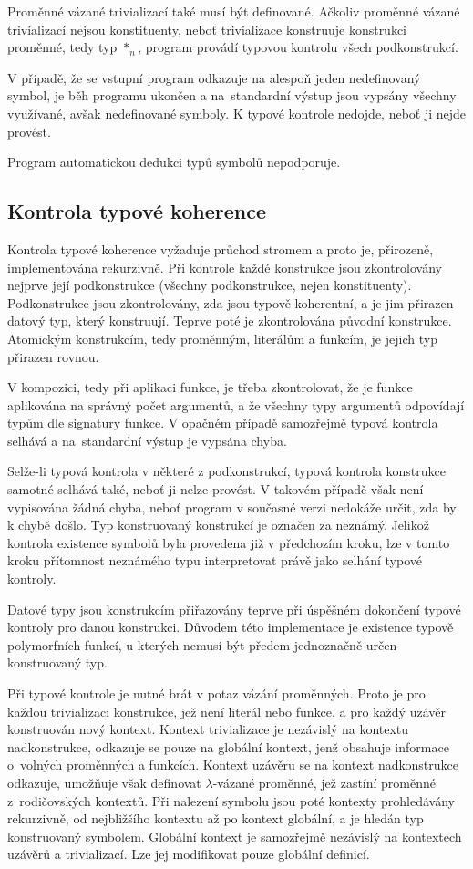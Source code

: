 \documentclass{article}
\begin{document}
Proměnné vázané trivializací také musí být definované. Ačkoliv proměnné vázané trivializací nejsou
konstituenty, neboť trivializace konstruuje konstrukci proměnné, tedy typ $*_{n}$, program provádí typovou
kontrolu všech podkonstrukcí.

V případě, že se vstupní program odkazuje na alespoň jeden nedefinovaný symbol, je běh programu ukončen a
na~standardní výstup jsou vypsány všechny využívané, avšak nedefinované symboly. K typové kontrole nedojde,
neboť ji nejde provést.

Program automatickou dedukci typů symbolů nepodporuje.

\subsection{Kontrola typové koherence}

Kontrola typové koherence vyžaduje průchod stromem a proto je, přirozeně, implementována rekurzivně. Při
kontrole každé konstrukce jsou zkontrolovány nejprve její podkonstrukce (všechny podkonstrukce, nejen
konstituenty). Podkonstrukce jsou zkontrolovány, zda jsou typově koherentní, a je jim přirazen datový
typ, který konstruují. Teprve poté je zkontrolována původní konstrukce. Atomickým konstrukcím, tedy
proměnným, literálům a funkcím, je jejich typ přirazen rovnou.

V kompozici, tedy při aplikaci funkce, je třeba zkontrolovat, že je funkce aplikována na správný počet
argumentů, a že všechny typy argumentů odpovídají typům dle signatury funkce. V opačném případě
samozřejmě typová kontrola selhává a na~standardní výstup je vypsána chyba.

Selže-li typová kontrola v některé z podkonstrukcí, typová kontrola konstrukce samotné selhává také,
neboť ji nelze provést. V takovém případě však není vypisována žádná chyba, neboť program v současné
verzi nedokáže určit, zda by k chybě došlo. Typ konstruovaný konstrukcí je označen za neznámý. Jelikož
kontrola existence symbolů byla provedena již v předchozím kroku, lze v tomto kroku přítomnost neznámého
typu interpretovat právě jako selhání typové kontroly.

Datové typy jsou konstrukcím přiřazovány teprve při úspěšném dokončení typové kontroly pro danou konstrukci.
Důvodem této implementace je existence typově polymorfních funkcí, u kterých nemusí být předem jednoznačně
určen konstruovaný typ.

Při typové kontrole je nutné brát v potaz vázání proměnných. Proto je pro každou trivializaci konstrukce, jež
není literál nebo funkce, a pro každý uzávěr konstruován nový kontext. Kontext trivializace je nezávislý na
kontextu nadkonstrukce, odkazuje se pouze na globální kontext, jenž obsahuje informace o~volných proměnných
a funkcích. Kontext uzávěru se na kontext nadkonstrukce odkazuje, umožňuje však definovat $\lambda$-vázané proměnné,
jež zastíní proměnné z~rodičovských kontextů. Při nalezení symbolu jsou poté kontexty prohledávány rekurzivně,
od nejbližšího kontextu až po kontext globální, a je hledán typ konstruovaný symbolem. Globální kontext je
samozřejmě nezávislý na kontextech uzávěrů a trivializací. Lze jej modifikovat pouze globální definicí.
\end{document}
